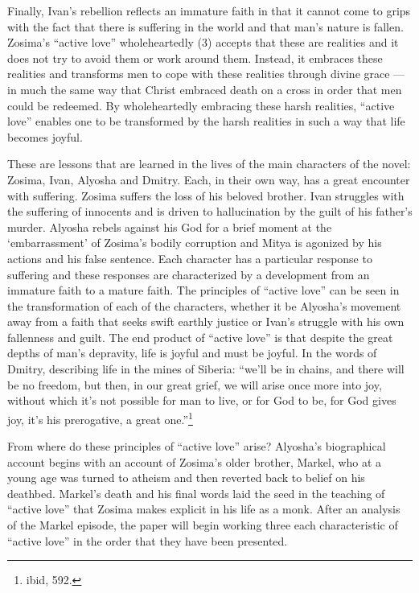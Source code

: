 Finally, Ivan's rebellion reflects an immature faith in that it cannot come to grips with the fact that there is suffering in the world and that man's nature is fallen. Zosima's ``active love'' wholeheartedly (3) accepts that these are realities and it does not try to avoid them or work around them. Instead, it embraces these realities and transforms men to cope with these realities through divine grace --- in much the same way that Christ embraced death on a cross in order that men could be redeemed. By wholeheartedly embracing these harsh realities, ``active love'' enables one to be transformed by the harsh realities in such a way that life becomes joyful.

These are lessons that are learned in the lives of the main characters of the novel: Zosima, Ivan, Alyosha and Dmitry. Each, in their own way, has a great encounter with suffering. Zosima suffers the loss of his beloved brother. Ivan struggles with the suffering of innocents and is driven to hallucination by the guilt of his father's murder. Alyosha rebels against his God for a brief moment at the `embarrassment' of Zosima's bodily corruption and Mitya is agonized by his actions and his false sentence. Each character has a particular response to suffering and these responses are characterized by a development from an immature faith to a mature faith. The principles of ``active love'' can be seen in the transformation of each of the characters, whether it be Alyosha's movement away from a faith that seeks swift earthly justice or Ivan's struggle with his own fallenness and guilt. The end product of ``active love'' is that despite the great depths of man's depravity, life is joyful and must be joyful. In the words of Dmitry, describing life in the mines of Siberia: ``we'll be in chains, and there will be no freedom, but then, in our great grief, we will arise once more into joy, without which it's not possible for man to live, or for God to be, for God gives joy, it's his prerogative, a great one.''\footnote{ibid, 592.}

From where do these principles of ``active love'' arise? Alyosha's biographical account begins with an account of Zosima's older brother, Markel, who at a young age was turned to atheism and then reverted back to belief on his deathbed. Markel's death and his final words laid the seed in the teaching of ``active love'' that Zosima makes explicit in his life as a monk. After an analysis of the Markel episode, the paper will begin working three each characteristic of ``active love'' in the order that they have been presented.

